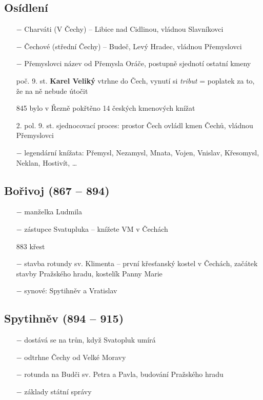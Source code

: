 \documentclass{article}
\begin{document}
\subsection*{Osídlení}
\begin{itemize}
    \vspace{-0.5em}
    \setlength\itemsep{0.15em}
    \item[$-$] Charváti (V Čechy) -- Libice nad Cidlinou, vládnou Slavníkovci
    \item[$-$] Čechové (střední Čechy) -- Budeč, Levý Hradec, vládnou Přemyslovci
    \item[$-$] Přemyslovci název od Přemysla Oráče, postupně sjednotí ostatní kmeny
\end{itemize}

\begin{itemize}
    \vspace{-0.5em}
    \setlength\itemsep{0.15em}
    \item[poč. 9. st.] \textbf{Karel Veliký} vtrhne do Čech, vynutí si \textit{tribut} = poplatek za to, že na ně nebude útočit
    \item[845] bylo v Řezně pokřtěno 14 českých kmenových knížat
    \item[2. pol. 9. st.] sjednocovací proces: prostor Čech ovládl kmen Čechů, vládnou Přemyslovci
    \item[$-$] legendární knížata: Přemysl, Nezamysl, Mnata, Vojen, Vnislav, Křesomysl, Neklan, Hostivít, \dots
\end{itemize}

\subsection*{Bořivoj (867 -- 894)}
\begin{itemize}
    \vspace{-0.5em}
    \setlength\itemsep{0.15em}
    \item[$-$] manželka Ludmila
    \item[$-$] zástupce Svatupluka -- knížete VM v Čechách
    \item[883] křest
    \item[$-$] stavba rotundy sv. Klimenta -- první křesťanský kostel v Čechách, začátek stavby Pražského hradu, kostelík Panny Marie
    \item[$-$] synové: Spytihněv a Vratislav
\end{itemize}

\subsection*{Spytihněv (894 -- 915)}
\begin{itemize}
    \vspace{-0.5em}
    \setlength\itemsep{0.15em}
    \item[$-$] dostává se na trůn, když Svatopluk umírá
    \item[$-$] odtrhne Čechy od Velké Moravy
    \item[$-$] rotunda na Budči sv. Petra a Pavla, budování Pražského hradu
    \item[$-$] základy státní správy
\end{itemize}
\end{document}
